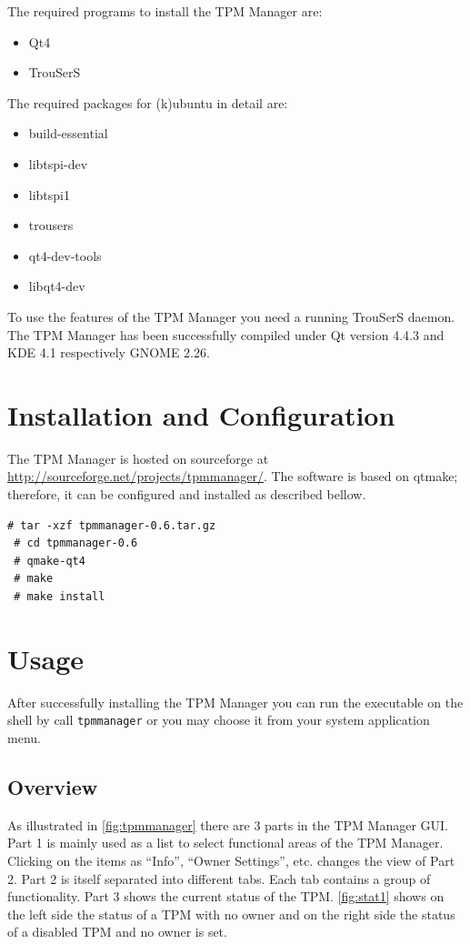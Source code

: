 \documentclass[
  american        %
]{sirrixreport}
\begin{document}
The required programs to install the TPM Manager are: 
\begin{itemize}
   \item Qt4
   \item TrouSerS
\end{itemize}

The required packages for (k)ubuntu in detail are:
\begin{itemize}
   \item build-essential
   \item libtspi-dev
   \item libtspi1
   \item trousers
   \item qt4-dev-tools
   \item libqt4-dev
\end{itemize}

To use the features of the TPM Manager you need a running TrouSerS daemon.
The TPM Manager has been successfully compiled under Qt version 4.4.3 and KDE 4.1 respectively GNOME 2.26.


\section{Installation and Configuration}
The TPM Manager is hosted on sourceforge at \url{http://sourceforge.net/projects/tpmmanager/}. The software is based on qtmake; therefore, it can be configured and installed as described bellow.


 \begin{lstlisting}[caption=Configuring and compiling the TPM Manager:, frame=lines]
 # tar -xzf tpmmanager-0.6.tar.gz
 # cd tpmmanager-0.6
 # qmake-qt4
 # make
 # make install
 \end{lstlisting}  


\clearpage
\section{Usage}

After successfully installing the TPM Manager you can run the executable on the shell by call \texttt{tpmmanager} or you may choose it from your system application menu. 

\subsection{Overview}
As illustrated in \autoref{fig:tpmmanager} there are 3 parts in the TPM Manager GUI. 
Part 1 is mainly used as a list to select functional areas of the TPM Manager. Clicking on the items as ``Info'', ``Owner Settings'', etc. changes the view of Part 2. Part 2 is itself separated into different tabs. Each tab contains a group of functionality. Part 3 shows the current status of the TPM. \autoref{fig:stat1} shows on the left side the status of a TPM with no owner and on the right side the status of a disabled TPM and no owner is set.
\end{document}
